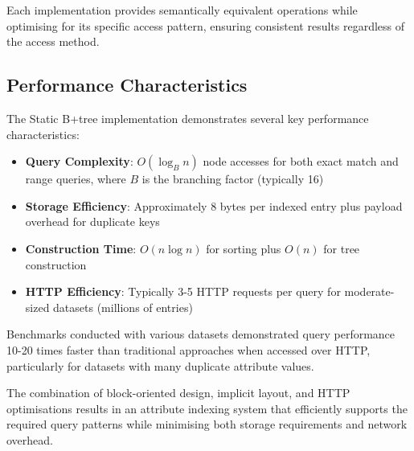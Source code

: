 Each implementation provides semantically equivalent operations while optimising for its specific access pattern, ensuring consistent results regardless of the access method.

\subsection{Performance Characteristics}
\label{methodology:attribute_index:performance_characteristics}

The Static B+tree implementation demonstrates several key performance characteristics:

\begin{itemize}
    \item \textbf{Query Complexity}: $O(\log_B n)$ node accesses for both exact match and range queries, where $B$ is the branching factor (typically 16)
    \item \textbf{Storage Efficiency}: Approximately 8 bytes per indexed entry plus payload overhead for duplicate keys
    \item \textbf{Construction Time}: $O(n \log n)$ for sorting plus $O(n)$ for tree construction
    \item \textbf{HTTP Efficiency}: Typically 3-5 HTTP requests per query for moderate-sized datasets (millions of entries)
\end{itemize}

Benchmarks conducted with various datasets demonstrated query performance 10-20 times faster than traditional approaches when accessed over HTTP, particularly for datasets with many duplicate attribute values.

The combination of block-oriented design, implicit layout, and HTTP optimisations results in an attribute indexing system that efficiently supports the required query patterns while minimising both storage requirements and network overhead.
